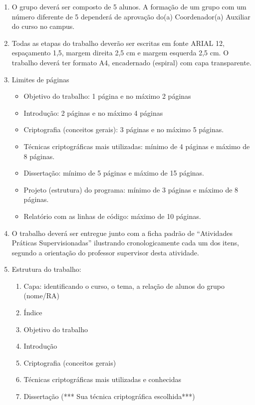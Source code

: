 \documentclass[12pt]{article}
\begin{document}
\renewcommand{\labelenumi}{\arabic{enumi}.}
\renewcommand{\labelenumii}{\arabic{enumi}.\arabic{enumii}.}
\renewcommand{\labelenumiii}{\arabic{enumi}.\arabic{enumii}.\arabic{enumiii}.}
\begin{enumerate}
\item O grupo deverá ser composto de 5 alunos. A formação de um grupo com um
número diferente de 5 dependerá de aprovação do(a) Coordenador(a) Auxiliar do
curso no campus.
\item Todas as etapas do trabalho deverão ser escritas em fonte ARIAL 12,
espaçamento 1,5, margem direita 2,5 cm e margem esquerda 2,5 cm. O trabalho
deverá ter formato A4, encadernado (espiral) com capa transparente.
\item Limites de páginas
\begin{itemize}
\item Objetivo do trabalho: 1 página e no máximo 2 páginas
\item Introdução: 2 páginas e no máximo 4 páginas
\item Criptografia (conceitos gerais): 3 páginas e no máximo 5 páginas.
\item Técnicas criptográficas mais utilizadas: mínimo de 4 páginas e máximo de 8
páginas.
\item Dissertação: mínimo de 5 páginas e máximo de 15 páginas.
\item Projeto (estrutura) do programa: mínimo de 3 páginas e máximo de 8 páginas.
\item Relatório com as linhas de código: máximo de 10 páginas.
\end{itemize}
\item O trabalho deverá ser entregue junto com a ficha padrão de “Atividades Práticas
Supervisionadas” ilustrando cronologicamente cada um dos itens, segundo a
orientação do professor supervisor desta atividade.
\item Estrutura do trabalho:

\begin{enumerate}

\item Capa: identificando o curso, o tema, a relação de alunos do grupo (nome/RA)
\item Índice
\item Objetivo do trabalho
\item Introdução
\item Criptografia (conceitos gerais)
\item Técnicas criptográficas mais utilizadas e conhecidas
\item Dissertação (*** Sua técnica criptográfica escolhida***)
\begin{enumerate}


\end{enumerate}
\end{enumerate}
\end{enumerate}
\end{document}
